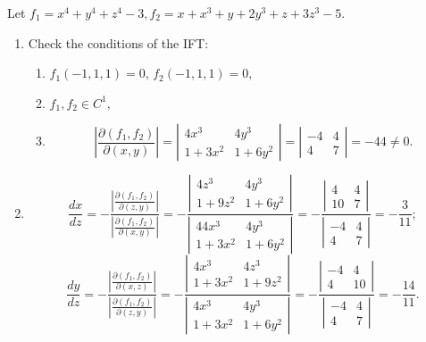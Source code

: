 \begin{enumerate}
Let $f_1 = x^4+y^4+z^4-3, f_2=x+x^3+y+2y^3+z+3z^3-5.$
\begin{enumerate}
\item Check the conditions of the IFT:
\begin{enumerate}
\item $f_1(-1,1,1) =0$, $f_2(-1,1,1)=0,$
\item $f_1, f_2 \in C^1,$
\item \begin{equation*}
\left|\frac {\partial(f_1,f_2)}{\partial(x,y)}\right|=\left|
\begin{array}{cc}
4x^3 & 4y^3 \\
1+3x^2 & 1+6y^2
\end{array}
\right|=\left|
\begin{array}{cc}
-4 & 4 \\
4 & 7
\end{array}
\right| = -44 \neq 0.
\end{equation*}
\end{enumerate}
\item
\begin{equation*}
\frac{d x}{d z} = -\frac{\left|\frac {\partial(f_1,f_2)}{\partial(z,y)}\right|}{\left|\frac {\partial(f_1,f_2)}{\partial(x,y)}\right|} = -\frac{
\left|
\begin{array}{cc}
4z^3 & 4y^3 \\
1+9z^2 & 1+6y^2
\end{array}
\right|
} {
\left|
\begin{array}{cc}
44x^3 & 4y^3 \\
1+3x^2 & 1+6y^2
\end{array}
\right|} = -\frac{
\left|
\begin{array}{cc}
4 & 4 \\
10 & 7
\end{array}
\right|
}{
\left|
\begin{array}{cc}
-4 & 4 \\
4 & 7
\end{array}
\right|
} = -\frac {3} {11};
\end{equation*}
\begin{equation*}
\frac{d y}{d z} = -\frac{\left|\frac {\partial(f_1,f_2)}{\partial(x,z)}\right|}{\left|\frac {\partial(f_1,f_2)}{\partial(z,y)}\right|} = -\frac{
\left|
\begin{array}{cc}
4x^3 & 4z^3 \\
1+3x^2 & 1+9z^2
\end{array}
\right|
} {
\left|
\begin{array}{cc}
4x^3 & 4y^3 \\
1+3x^2 & 1+6y^2
\end{array}
\right|} = -\frac{
\left|
\begin{array}{cc}
-4 & 	4 \\
4 & 10
\end{array}
\right|
}{
\left|
\begin{array}{cc}
-4 & 4 \\
4 & 7
\end{array}
\right|
} = -\frac {14} {11}.
\end{equation*}
\end{enumerate}



\end{enumerate}
